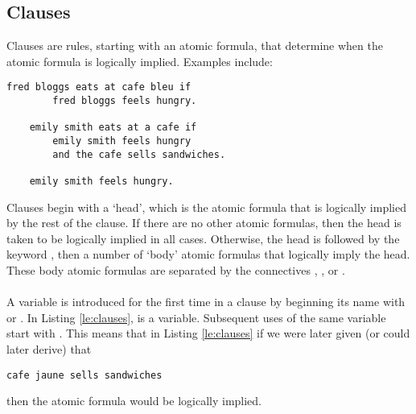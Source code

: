 \documentclass[../main.tex]{subfiles}
\begin{document}
\subsection{Clauses}
Clauses are rules, starting with an atomic formula, that determine when the atomic formula is logically implied. Examples include:
\newpage
\begin{lstlisting}[language={LE},label={le:clauses},caption={Examples of clauses in Logical English.}]
    fred bloggs eats at cafe bleu if
        fred bloggs feels hungry.

    emily smith eats at a cafe if
        emily smith feels hungry
        and the cafe sells sandwiches.

    emily smith feels hungry.
\end{lstlisting}
Clauses begin with a `head', which is the atomic formula that is logically implied by the rest of the clause. If there are no other atomic formulas, then the head is taken to be logically implied in all cases. Otherwise, the head is followed by the keyword , then a number of `body' atomic formulas that logically imply the head. These body atomic formulas are separated by the connectives , , or .
\\
\\
A variable is introduced for the first time in a clause by beginning its name with  or . In Listing \ref{le:clauses},  is a variable. Subsequent uses of the same variable start with . This means that in Listing \ref{le:clauses} if we were later given (or could later derive) that
\begin{lstlisting}[language={LE}]
    cafe jaune sells sandwiches
\end{lstlisting}
then the atomic formula  would be logically implied. 
\end{document}
